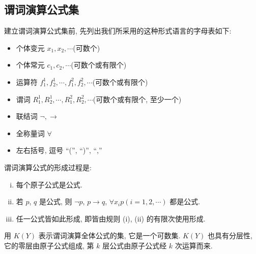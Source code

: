 \documentclass[
    mode=hazy,
    color=blue,
    device=normal,
    lang=cn
]{elegantnote}
\begin{document}
    \subsection{谓词演算公式集}
        建立谓词演算公式集前, 先列出我们所采用的这种形式语言的字母表如下:
        \begin{itemize}[listparindent = 2em]
            \item 个体变元 $x_1, x_2, \cdots$\hfill (可数个)
            \item 个体常元 $c_1, c_2, \cdots$\hfill (可数个或有限个)
            \item 运算符 $f_1^1, f_2^1, \cdots, f_1^2, f_2^2, \cdots$\hfill (可数个或有限个)
            \item 谓词 $R_1^1, R_2^1, \cdots, R_1^2, R_2^2, \cdots$\hfill (可数个或有限个, 至少一个)
            \item 联结词 $\lnot, \to$
            \item 全称量词 $\forall$
            \item 左右括号, 逗号 ``('', ``)'', ``,''
        \end{itemize}
        谓词演算公式的形成过程是:
        \begin{enumerate}[(i)]
            \item 每个原子公式是公式.
            \item 若 $p$, $q$ 是公式, 则 $\lnot p$, $p\to q$, $\forall x_i p(i = 1, 2, \cdots)$ 都是公式.
            \item 任一公式皆如此形成, 即皆由规则 (i), (ii) 的有限次使用形成.
        \end{enumerate}
        用 $K(Y)$ 表示谓词演算全体公式的集, 它是一个可数集. $K(Y)$ 也具有分层性, 它的零层由原子公式组成, 第 $k$ 层公式由原子公式经 $k$ 次运算而来.
\end{document}
